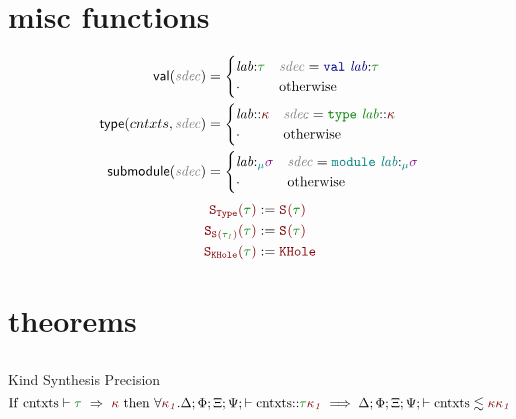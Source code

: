 \documentclass[10pt,fleqn]{article}
\begin{document}
    \begin{minipage}{\textwidth}
    \end{minipage}
    \begin{minipage}{\textwidth}
    \end{minipage}
\section*{misc functions}
    \begin{align*}
        \val{\sdec} &=
        \begin{cases}
            \lab\TypAssump\typ & \sdec = \ValSdec{\lab}{\typ} \\
            \cdot & \textrm{otherwise} \\
        \end{cases} \\
        \type{cntxts}{\sdec} &=
        \begin{cases}
            \lab\KndAssump\knd & \sdec = \TypeSdec{\lab}{\knd} \\
            \cdot & \textrm{otherwise} \\
        \end{cases} \\
        \submodule{\sdec} &=
        \begin{cases}
            \lab\SigAssump\sig & \sdec = \ModSdec{\lab}{\sig} \\
            \cdot & \textrm{otherwise} \\
        \end{cases} \\
    \end{align*}
    \begin{align*}
        \SKind[\Type]{\typ} &:= \SKind{\typ} \\
        \SKind[\SKind{\typ[_1]}]{\typ} &:= \SKind{\typ} \\
        \SKind[\KHole]{\typ} &:= \KHole \\
    \end{align*}
\section*{theorems}
    \subsection*{}
    Kind Synthesis Precision
    \[
        \mathrm{
            If~\Syn{cntxts}{\typ}{\knd}~then~
            \forall \knd[_1].\WellFormedAtKind{cntxts}{\typ}{\knd[_1]} \implies \ConsistentSubkind{cntxts}{\knd}{\knd[_1]}
        }
    \]
\end{document}
